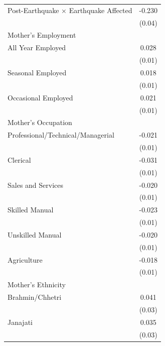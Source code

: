 \begin{longtable}{l*{1}{c}}
Post-Earthquake × Earthquake Affected & -0.230\sym{***} \\
                    & (0.04) \\
\multicolumn{2}{l}{Mother's Employment} \\
\hspace{1em}All Year Employed & 0.028\sym{***} \\
                    & (0.01) \\
\hspace{1em}Seasonal Employed & 0.018\sym{**} \\
                    & (0.01) \\
\hspace{1em}Occasional Employed & 0.021\sym{***} \\
                    & (0.01) \\
\multicolumn{2}{l}{Mother's Occupation} \\
\hspace{1em}Professional/Technical/Managerial & -0.021\sym{*} \\
                    & (0.01) \\
\hspace{1em}Clerical & -0.031\sym{**} \\
                    & (0.01) \\
\hspace{1em}Sales and Services & -0.020\sym{***} \\
                    & (0.01) \\
\hspace{1em}Skilled Manual & -0.023\sym{***} \\
                    & (0.01) \\
\hspace{1em}Unskilled Manual & -0.020\sym{**} \\
                    & (0.01) \\
\hspace{1em}Agriculture & -0.018\sym{**} \\
                    & (0.01) \\
\multicolumn{2}{l}{Mother's Ethnicity} \\
\hspace{1em}Brahmin/Chhetri & 0.041 \\
                    & (0.03) \\
\hspace{1em}Janajati & 0.035 \\
                    & (0.03) \\

\end{longtable}

